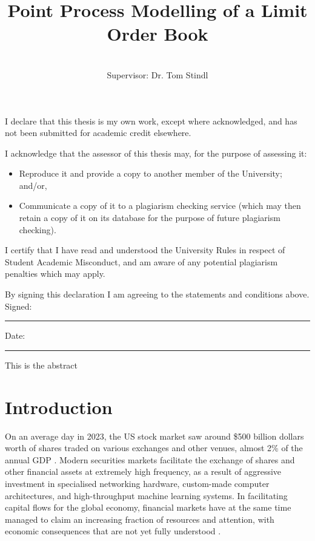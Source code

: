 \documentclass[honours,12pt]{unswthesis}
\title{Point Process Modelling of a Limit Order Book}
\author{\Authornameonly\\{\bigskip}Supervisor: Dr. Tom Stindl}
\newcommand\blankpage{%
    \null
    \thispagestyle{empty}%
    \addtocounter{page}{-1}%
    \newpage}
\numberwithin{equation}{section}
\begin{document}
\beforepreface

\afterpage{\blankpage}



\vskip 10pc \noindent I declare that this thesis is my
own work, except where acknowledged, and has not been submitted for
academic credit elsewhere. 

\vskip 2pc  \noindent I acknowledge that the assessor of this
thesis may, for the purpose of assessing it:
\begin{itemize}
\item Reproduce it and provide a copy to another member of the University; and/or,
\item Communicate a copy of it to a plagiarism checking service (which may then retain a copy of it on its database for the purpose of future plagiarism checking).
\end{itemize}

\vskip 2pc \noindent I certify that I have read and understood the University Rules in
respect of Student Academic Misconduct, and am aware of any potential plagiarism penalties which may 
apply.\vspace{24pt}

\vskip 2pc \noindent By signing 
this declaration I am
agreeing to the statements and conditions above.
\vskip 2pc \noindent
Signed: \rule{7cm}{0.25pt} \hfill Date: \rule{4cm}{0.25pt} \newline
\vskip 1pc

\afterpage{\blankpage}




\afterpage{\blankpage}



This is the abstract
\afterpage{\blankpage}


\afterpreface

\afterpage{\blankpage}

\chapter{Introduction}\label{s-intro}

On an average day in 2023, the US stock market saw around \$500 billion dollars worth of shares traded on various exchanges and other venues, almost 2\% of the annual GDP \cite{FINRA2024}. Modern securities markets facilitate the exchange of shares and other financial assets at extremely high frequency, as a result of aggressive investment in specialised networking hardware, custom-made computer architectures, and high-throughput machine learning systems. In facilitating capital flows for the global economy, financial markets have at the same time managed to claim an increasing fraction of resources and attention, with economic consequences that are not yet fully understood \cite{Palley2007}.
\end{document}

